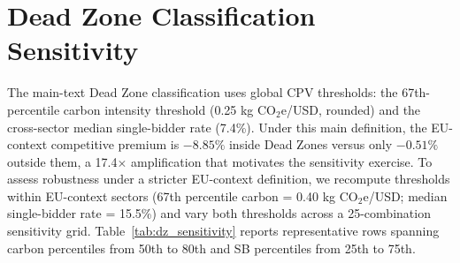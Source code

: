 \documentclass[11pt]{article}
\begin{document}
\section{Dead Zone Classification Sensitivity}
\label{sec:dz_sensitivity}

The main-text Dead Zone classification uses global CPV thresholds: the 67th-percentile carbon intensity threshold (0.25 kg CO$_2$e/USD, rounded) and the cross-sector median single-bidder rate (7.4\%). Under this main definition, the EU-context competitive premium is $-8.85\%$ inside Dead Zones versus only $-0.51\%$ outside them, a 17.4$\times$ amplification that motivates the sensitivity exercise. To assess robustness under a stricter EU-context definition, we recompute thresholds within EU-context sectors (67th percentile carbon = 0.40 kg CO$_2$e/USD; median single-bidder rate = 15.5\%) and vary both thresholds across a 25-combination sensitivity grid. Table~\ref{tab:dz_sensitivity} reports representative rows spanning carbon percentiles from 50th to 80th and SB percentiles from 25th to 75th.
\end{document}
